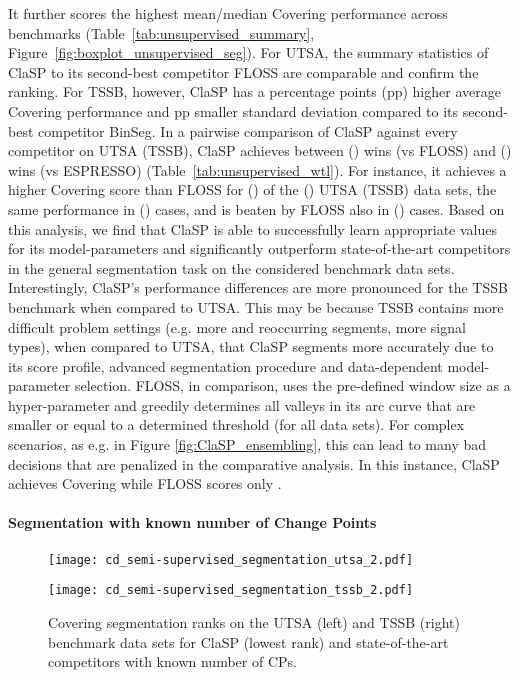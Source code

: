 \documentclass[pdflatex,sn-basic]{sn-jnl}
\begin{document}
It further scores the highest mean/median Covering performance across benchmarks (Table~\ref{tab:unsupervised_summary}, Figure~\ref{fig:boxplot_unsupervised_seg}). For UTSA, the summary statistics of ClaSP to its second-best competitor FLOSS are comparable and confirm the ranking. For TSSB, however, ClaSP has a  percentage points (pp) higher average Covering performance and  pp smaller standard deviation compared to its second-best competitor BinSeg. In a pairwise comparison of ClaSP against every competitor on UTSA (TSSB), ClaSP achieves between  () wins (vs FLOSS) and  () wins (vs ESPRESSO) (Table~\ref{tab:unsupervised_wtl}). For instance, it achieves a higher Covering score than FLOSS for  () of the  () UTSA (TSSB) data sets, the same performance in  () cases, and is beaten by FLOSS also in  () cases. Based on this analysis, we find that ClaSP is able to successfully learn appropriate values for its model-parameters and significantly outperform state-of-the-art competitors in the general segmentation task on the considered benchmark data sets. Interestingly, ClaSP's performance differences are more pronounced for the TSSB benchmark when compared to UTSA. This may be because TSSB contains more difficult problem settings (e.g. more and reoccurring segments, more signal types), when compared to UTSA, that ClaSP segments more accurately due to its score profile,  advanced segmentation procedure and data-dependent model-parameter selection. FLOSS, in comparison, uses the pre-defined window size as a hyper-parameter and greedily determines all valleys in its arc curve that are smaller or equal to a determined threshold (for all data sets). For complex scenarios, as e.g. in Figure \ref{fig:ClaSP_ensembling}, this can lead to many bad decisions that are penalized in the comparative analysis. In this instance, ClaSP achieves  Covering while FLOSS scores only .

\paragraph{Segmentation with known number of Change Points}

\begin{figure}[t]
	\begin{minipage}{6cm}
        \texttt{[image: cd\_semi-supervised\_segmentation\_utsa\_2.pdf]}
	\end{minipage}
	\begin{minipage}{6cm}
        \texttt{[image: cd\_semi-supervised\_segmentation\_tssb\_2.pdf]}
	\end{minipage}
	\caption{Covering segmentation ranks on the  UTSA (left) and  TSSB (right) benchmark data sets for ClaSP (lowest rank) and  state-of-the-art competitors with known number of CPs.\label{fig:cd_semi-supervised_seg}
	}
\end{figure}
\end{document}
